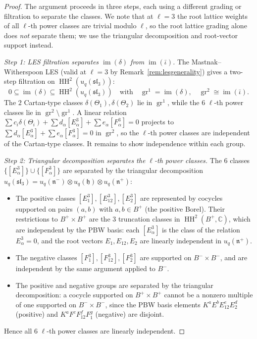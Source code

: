 \documentclass[11pt,letterpaper]{amsart}
\theoremstyle{plain}
\theoremstyle{definition}
\theoremstyle{remark}
\newcommand{\HH}{\operatorname{HH}}
\newcommand{\CC}{\mathbb{C}}
\newcommand{\bplus}{B^{+}}
\newcommand{\bminus}{B^{-}}
\begin{document}
\begin{proof}
The argument proceeds in three steps, each using a different grading or filtration to separate the classes. We note that at $\ell = 3$ the root lattice weights of all $\ell$-th power classes are trivial modulo $\ell$, so the root lattice grading alone does \emph{not} separate them; we use the triangular decomposition and root-vector support instead.

\emph{Step 1: LES filtration separates $\operatorname{im}(\delta)$ from $\operatorname{im}(\bar\iota)$.} The Mastnak--Witherspoon LES (valid at $\ell = 3$ by Remark~\ref{rem:lesgenerality}) gives a two-step filtration on $\HH^2(u_q(\mathfrak{sl}_3))$:
\[
0 \subseteq \operatorname{im}(\delta) \subseteq \HH^2(u_q(\mathfrak{sl}_3)) \quad \text{with} \quad \operatorname{gr}^1 = \operatorname{im}(\delta), \quad \operatorname{gr}^2 \cong \operatorname{im}(\bar\iota).
\]
The $2$ Cartan-type classes $\delta(\Theta_1), \delta(\Theta_2)$ lie in $\operatorname{gr}^1$, while the $6$ $\ell$-th power classes lie in $\operatorname{gr}^2 \setminus \operatorname{gr}^1$. A linear relation $\sum c_i \delta(\Theta_i) + \sum d_\alpha [E_\alpha^3] + \sum e_\alpha [F_\alpha^3] = 0$ projects to $\sum d_\alpha [E_\alpha^3] + \sum e_\alpha [F_\alpha^3] = 0$ in $\operatorname{gr}^2$, so the $\ell$-th power classes are independent of the Cartan-type classes. It remains to show independence within each group.

\emph{Step 2: Triangular decomposition separates the $\ell$-th power classes.} The $6$ classes $\{[E_\alpha^3]\} \cup \{[F_\alpha^3]\}$ are separated by the triangular decomposition $u_q(\mathfrak{sl}_3) = u_q(\mathfrak{n}^-) \otimes u_q(\mathfrak{h}) \otimes u_q(\mathfrak{n}^+)$:
\begin{itemize}
\item The positive classes $[E_1^3], [E_{12}^3], [E_2^3]$ are represented by cocycles supported on pairs $(a, b)$ with $a, b \in \bplus$ (the positive Borel). Their restrictions to $\bplus \times \bplus$ are the $3$ truncation classes in $\HH^2(\bplus, \CC)$, which are independent by the PBW basis: each $[E_\alpha^3]$ is the class of the relation $E_\alpha^3 = 0$, and the root vectors $E_1, E_{12}, E_2$ are linearly independent in $u_q(\mathfrak{n}^+)$.
\item The negative classes $[F_1^3], [F_{12}^3], [F_2^3]$ are supported on $\bminus \times \bminus$, and are independent by the same argument applied to $\bminus$.
\item The positive and negative groups are separated by the triangular decomposition: a cocycle supported on $\bplus \times \bplus$ cannot be a nonzero multiple of one supported on $\bminus \times \bminus$, since the PBW basis elements $K^a E^b E_{12}^e E_2^d$ (positive) and $K^a F^c F_{12}^f F_1^g$ (negative) are disjoint.
\end{itemize}
Hence all $6$ $\ell$-th power classes are linearly independent.


\end{proof}
\end{document}
